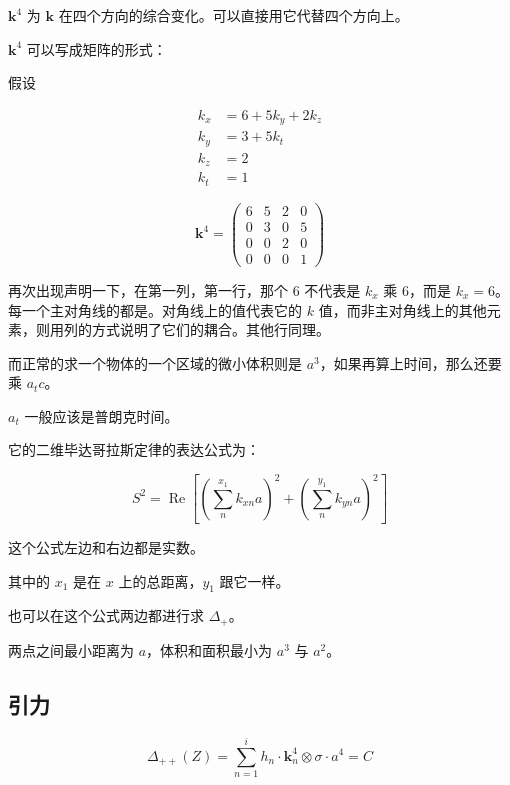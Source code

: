 \documentclass[UTF8]{ctexart}
\begin{document}
\(\mathbf{k}^4\) 为 \(\mathbf{k}\) 在四个方向的综合变化。可以直接用它代替四个方向上。

\(\mathbf{k}^4\) 可以写成矩阵的形式：

假设

\begin{align*}
k_x &= 6+5k_y+2k_z\\
k_y &= 3+5k_t\\
k_z &= 2\\
k_t &= 1
\end{align*}

\begin{equation}
\mathbf{k}^4=
\begin{pmatrix}
6 & 5 & 2 & 0\\
0 & 3 & 0 & 5\\
0 & 0 & 2 & 0\\
0 & 0 & 0 & 1
\end{pmatrix}
\end{equation}

再次出现声明一下，在第一列，第一行，那个 \(6\) 不代表是 \(k_x\) 乘 \(6\)，而是 \(k_x=6\)。每一个主对角线的都是。对角线上的值代表它的 \(k\) 值，而非主对角线上的其他元素，则用列的方式说明了它们的耦合。其他行同理。

而正常的求一个物体的一个区域的微小体积则是 \(a^3\)，如果再算上时间，那么还要乘 \(a_tc\)。

\(a_t\) 一般应该是普朗克时间。

它的二维毕达哥拉斯定律的表达公式为：

\begin{equation}
S^2=\operatorname{Re}\left[\left(\sum_{n}^{x_1}k_{xn}a\right)^2+\left(\sum_{n}^{y_1}k_{yn}a\right)^2\right]
\end{equation}

这个公式左边和右边都是实数。

其中的 \(x_1\) 是在 \(x\) 上的总距离，\(y_1\) 跟它一样。

也可以在这个公式两边都进行求 \(\Delta_+\)。

两点之间最小距离为 \(a\)，体积和面积最小为 \(a^3\) 与 \(a^2\)。

\subsection{引力}

\begin{equation}
\Delta_{++}(Z)=\sum_{n=1}^{i}h_n\cdot\mathbf{k}^4_n\otimes\sigma\cdot a^4=C
\end{equation}
\end{document}
